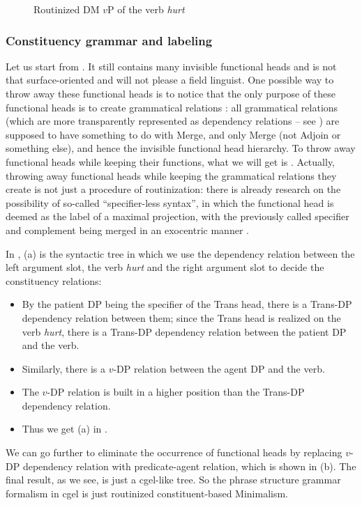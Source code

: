 \documentclass[../main.tex]{subfiles}
\begin{document}
\begin{figure}
    \centering
    
    \caption{Routinized DM $v$P of the verb \emph{hurt}}
    \label{fig:hurt-dm-routine}
\end{figure}


\subsubsection{Constituency grammar and labeling}\label{sec:phrase-label}

Let us start from . 
It still contains many invisible functional heads 
and is not that surface-oriented and will not please a field linguist. 
One possible way to throw away these functional heads is to notice that 
the only purpose of these functional heads is to create grammatical relations \citep{hornstein2021extended}: 
all grammatical relations (which are more transparently represented as dependency relations 
-- see ) are supposed to have something to do with Merge, 
and only Merge (not Adjoin or something else), and hence the invisible functional head hierarchy.
To throw away functional heads while keeping their functions, 
what we will get is . 
Actually, throwing away functional heads while keeping the grammatical relations they create 
is not just a procedure of routinization: 
there is already research on the possibility of so-called ``specifier-less syntax'',
in which the functional head is deemed as the label of a maximal projection, 
with the previously called specifier and complement being merged in an exocentric manner \citep{osborne2011bare}.

In , (a) is the syntactic tree in which 
we use the dependency relation between the left argument slot, the verb \emph{hurt} and the right 
argument slot to decide the constituency relations:
\begin{itemize}
    \item By the patient DP being the specifier of the Trans head, there is a Trans-DP dependency relation between them; since the Trans head is realized on the verb \emph{hurt}, there is a Trans-DP dependency relation between the patient DP and the verb. %
    \item Similarly, there is a $v$-DP relation between the agent DP and the verb.
    \item The $v$-DP relation is built in a higher position than the Trans-DP dependency relation.
    \item Thus we get (a) in .
\end{itemize}
We can go further to eliminate the occurrence of functional heads by replacing $v$-DP dependency relation 
with predicate-agent relation, which is shown in (b). The final result, as we see, is just a \ac{cgel}-like 
tree. So the phrase structure grammar formalism in \ac{cgel} is just routinized constituent-based Minimalism.
\end{document}
